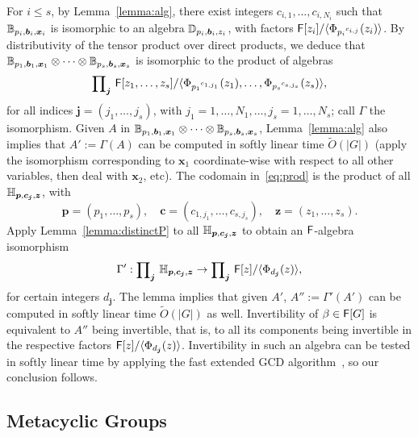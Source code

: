 For $i \le s$, by Lemma~\ref{lemma:alg}, there exist integers
$c_{i,1},\dots,c_{i,N_i}$ such that
$\mathbb{B}_{p_i,\boldsymbol{b}_i,\boldsymbol{x}_i}$ is isomorphic to an
algebra $\mathbb{D}_{p_i, \boldsymbol{b}_i, z_i}$, with factors 
${\mathsf{F}}[z_i]/\langle \Phi_{{p_i}^{c_{i,j}}}(z_i) \rangle$.
By distributivity of the tensor product over direct products, we
deduce that $\mathbb{B}_{p_1,\boldsymbol{b}_1,\boldsymbol{x}_1} \otimes \cdots
\otimes \mathbb{B}_{p_s,\boldsymbol{b}_s,\boldsymbol{x}_s}$ is isomorphic to
the product of algebras
 \begin{equation}\label{eq:prod}
\text{\small $\prod$}_{\boldsymbol{j}}~ {\mathsf{F}}[z_1,\dots,z_s]/
\langle \Phi_{{p_1}^{c_{1,j_1}}}(z_1),\dots, \Phi_{{p_s}^{c_{s,j_s}}}(z_s) \rangle,   
 \end{equation}
for all indices $\boldsymbol{j}=(j_1,\dots,j_s)$, with
$j_1 =1,\dots,N_1,\dots,j_s=1,\dots,N_s$;
call $\Gamma$ the isomorphism. Given $A$ in $\mathbb{B}_{p_1,\boldsymbol{b}_1,\boldsymbol{x}_1} \otimes
\cdots \otimes \mathbb{B}_{p_s,\boldsymbol{b}_s,\boldsymbol{x}_s}$,
Lemma~\ref{lemma:alg} also implies that $A':=\Gamma(A)$ can be
computed in softly linear time $\tilde{O}(|G|)$ (apply the isomorphism
corresponding to $\boldsymbol{x}_1$ coordinate-wise with respect to
all other variables, then deal with $\boldsymbol{x}_2$, etc).
The codomain in~\eqref{eq:prod} is the product of all $\mathbb{H}_{\boldsymbol{p},\boldsymbol{c}_{\boldsymbol{j}},\boldsymbol{z}}$,
with 
$$\boldsymbol{p}=(p_1,\dots,p_s),\quad \boldsymbol{c}=(c_{1,j_1},\dots,c_{s,j_s}),\quad \boldsymbol{z}=(z_1,\dots,z_s).$$
Apply Lemma~\ref{lemma:distinctP} to all 
$\mathbb{H}_{\boldsymbol{p},\boldsymbol{c}_{\boldsymbol{j}},\boldsymbol{z}}$ to obtain
an ${\mathsf{F}}$-algebra isomorphism
$$\Gamma': \text{\small $\prod$}_{\boldsymbol{j}}~
\mathbb{H}_{\boldsymbol{p},\boldsymbol{c}_{\boldsymbol{j}},\boldsymbol{z}} \to
\text{\small $\prod$}_{\boldsymbol{j}} ~{\mathsf{F}}[z]/\langle
\Phi_{d_{\boldsymbol{j}}}(z) \rangle,$$ for certain integers
$d_{\boldsymbol{j}}$. The lemma implies that given $A'$,
$A'':=\Gamma'(A')$ can be computed in softly linear time
$\tilde{O}(|G|)$ as well. Invertibility of $\beta \in {\mathsf{F}}[G]$ is
equivalent to $A''$ being invertible, that is, to all its components
being invertible in the respective factors ${\mathsf{F}}[z]/\langle
\Phi_{d_{\boldsymbol{j}}}(z) \rangle$. Invertibility in such an
algebra can be tested in softly linear time by applying the fast
extended GCD algorithm~\cite[Chapter~11]{vzGathen13}, so our conclusion follows.


\subsection{Metacyclic Groups}

